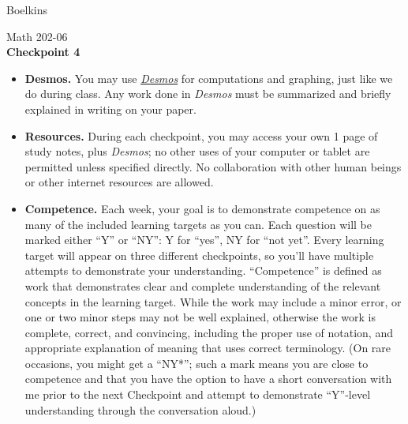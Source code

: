 \documentclass[11 pt]{article}
\begin{document}
 \hfill Boelkins \\
 
\begin{center}
Math 202-06 \\
{\bf Checkpoint 4}
\end{center}



\begin{itemize}
	
	\item {\bf Desmos.} You may use \href{https://www.desmos.com/calculator}{\emph{Desmos}} for computations and graphing, just like we do during class.  Any work done in \emph{Desmos} must be summarized and briefly explained in writing on your paper.  
	
	\item {\bf Resources.} During each checkpoint, you may access your own 1 page of study notes, plus \emph{Desmos}; no other uses of your computer or tablet are permitted unless specified directly.  No collaboration with other human beings or other internet resources are allowed.
	
	
	\item {\bf Competence.} Each week, your goal is to demonstrate competence on as many of the included learning targets as you can.  Each question will be marked either ``Y'' or ``NY'': Y for ``yes'', NY for ``not yet''.  Every learning target will appear on three different checkpoints, so you'll have multiple attempts to demonstrate your understanding.  ``Competence'' is defined as work that demonstrates clear and complete understanding of the relevant concepts in the learning target. While the work may include a minor error, or one or two minor steps may not be well explained, otherwise the work is complete, correct, and convincing, including the proper use of notation, and appropriate explanation of meaning that uses correct terminology.  (On rare occasions, you might get a ``NY*''; such a mark means you are close to competence and that you have the option to have a short conversation with me prior to the next Checkpoint and attempt to demonstrate ``Y''-level understanding through the conversation aloud.)	
\end{itemize}

\noindent \hrulefill \\
\end{document}
